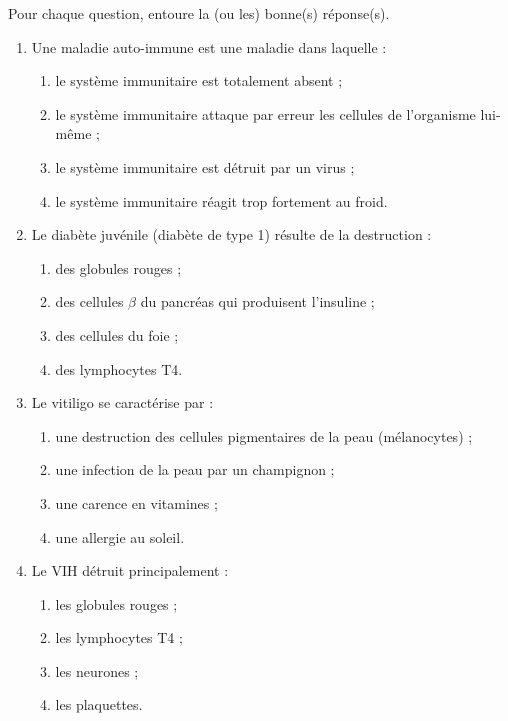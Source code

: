 \documentclass[11pt]{article}
\begin{document}
\begin{exercice}
Pour chaque question, entoure la (ou les) bonne(s) réponse(s).
\begin{enumerate}
\item Une maladie auto-immune est une maladie dans laquelle :
\begin{enumerate}
\item le système immunitaire est totalement absent ;
\item le système immunitaire attaque par erreur les cellules de l'organisme lui-même ;
\item le système immunitaire est détruit par un virus ;
\item le système immunitaire réagit trop fortement au froid.
\end{enumerate}
\item Le diabète juvénile (diabète de type 1) résulte de la destruction :
\begin{enumerate}
\item des globules rouges ;
\item des cellules $\beta$ du pancréas qui produisent l'insuline ;
\item des cellules du foie ;
\item des lymphocytes T4.
\end{enumerate}
\item Le vitiligo se caractérise par :
\begin{enumerate}
\item une destruction des cellules pigmentaires de la peau (mélanocytes) ;
\item une infection de la peau par un champignon ;
\item une carence en vitamines ;
\item une allergie au soleil.
\end{enumerate}
\item Le VIH détruit principalement :
\begin{enumerate}
\item les globules rouges ;
\item les lymphocytes T4 ;
\item les neurones ;
\item les plaquettes.
\end{enumerate}
\end{enumerate}
\end{exercice}
\end{document}
